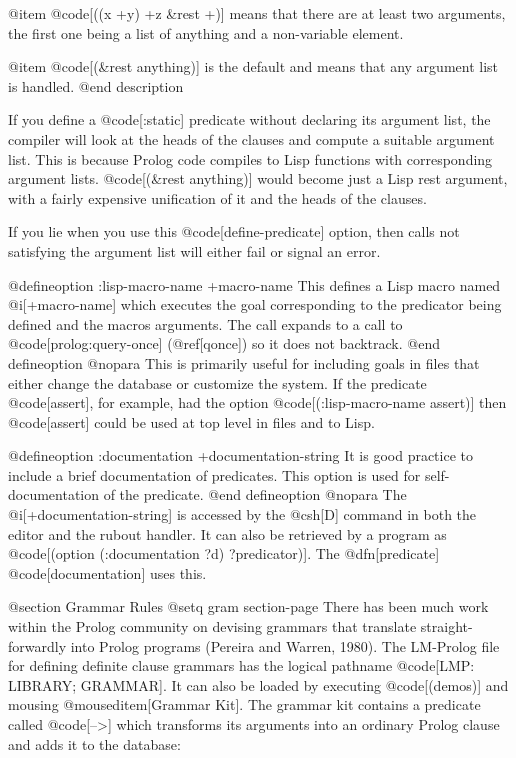 {@item @code[((x +y) +z &rest +)]
means that there are at least two arguments, the first one
being a list of anything and a non-variable element.

@item @code[(&rest anything)]
is the default and means that any argument list is handled.
@end description

If you define a @code[:static] predicate without declaring its argument list,
the compiler will look at the heads of the clauses and compute
a suitable argument list.  This is because Prolog code compiles to Lisp
functions with corresponding argument lists.
@code[(&rest anything)] would become just a Lisp rest argument, with
a fairly expensive unification of it and the heads of the clauses.

If you lie when you use this @code[define-predicate] option,
then calls not satisfying the argument list will either fail or
signal an error.

@defineoption :lisp-macro-name +macro-name
This defines a Lisp macro named @i[+macro-name] which executes
the goal
corresponding to the predicator being defined and the macros arguments.
The call expands to a call to @code[prolog:query-once] (@ref[qonce])
so it does not backtrack.
@end defineoption
@nopara
This is primarily useful for including goals in files that either change
the database or customize the system.
If the predicate @code[assert], for example, had the option
@code[(:lisp-macro-name assert)] 
then @code[assert] could be used at top level in files and to Lisp.

@defineoption :documentation +documentation-string
It is good practice to include a brief documentation of predicates.
This option is used for self-documentation of the predicate.
@end defineoption
@nopara
The @i[+documentation-string] is accessed by the @csh[D] command in 
both the editor and the rubout handler.
It can also be retrieved by a program as 
@code[(option (:documentation ?d) ?predicator)].
The @dfn[predicate] @code[documentation] uses this.

@section Grammar Rules
@setq gram section-page
There has been much work within the Prolog community on devising grammars that
translate straight-forwardly into Prolog programs (Pereira and Warren, 1980).
The LM-Prolog file for defining definite clause grammars has the logical
pathname @code[LMP: LIBRARY; GRAMMAR].
It can also be loaded by executing @code[(demos)] and mousing
@mouseditem[Grammar Kit].
The grammar kit contains a predicate called @code[-->] which transforms its
arguments into an ordinary Prolog clause and adds it to the database:

}
